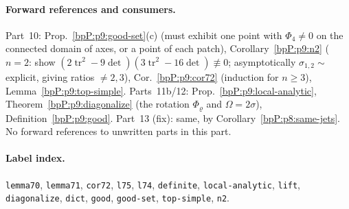 \paragraph{Forward references and consumers.} Part~10: Prop.~\ref{bpP:p9:good-set}(c) (must exhibit one point with $\Phi_4\ne0$ on the connected domain of axes, or a point of each patch), Corollary~\ref{bpP:p9:n2} ($n=2$: show $(2\operatorname{tr}^2-9\det)(3\operatorname{tr}^2-16\det)\not\equiv0$; asymptotically $\sigma_{1,2}\sim$ explicit, giving ratios $\ne2,3$), Cor.~\ref{bpP:p9:cor72} (induction for $n\ge3$), Lemma~\ref{bpP:p9:top-simple}. Parts~11b/12: Prop.~\ref{bpP:p9:local-analytic}, Theorem~\ref{bpP:p9:diagonalize} (the rotation $\Phi_\varrho$ and $\Omega=2\sigma$), Definition~\ref{bpP:p9:good}. Part~13 (fix): same, by Corollary~\ref{bpP:p8:same-jets}. No forward references to unwritten parts in this part.

\paragraph{Label index.} \texttt{lemma70}, \texttt{lemma71}, \texttt{cor72}, \texttt{l75}, \texttt{l74}, \texttt{definite}, \texttt{local-analytic}, \texttt{lift}, \texttt{diagonalize}, \texttt{dict}, \texttt{good}, \texttt{good-set}, \texttt{top-simple}, \texttt{n2}.
\par\endgroup
